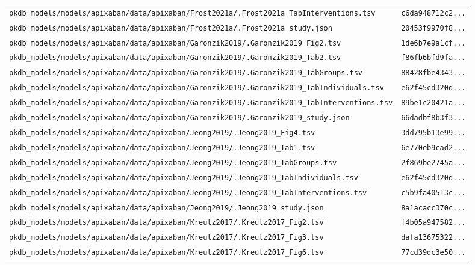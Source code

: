 \begin{longtable}{ll}
\texttt{pkdb\_models/models/apixaban/data/apixaban/Frost2021a/.Frost2021a\_TabInterventions.tsv} & \texttt{c6da948712c2...} \\
\texttt{pkdb\_models/models/apixaban/data/apixaban/Frost2021a/.Frost2021a\_study.json} & \texttt{20453f9970f8...} \\
\texttt{pkdb\_models/models/apixaban/data/apixaban/Garonzik2019/.Garonzik2019\_Fig2.tsv} & \texttt{1de6b7e9a1cf...} \\
\texttt{pkdb\_models/models/apixaban/data/apixaban/Garonzik2019/.Garonzik2019\_Tab2.tsv} & \texttt{f86fb6bfd9fa...} \\
\texttt{pkdb\_models/models/apixaban/data/apixaban/Garonzik2019/.Garonzik2019\_TabGroups.tsv} & \texttt{88428fbe4343...} \\
\texttt{pkdb\_models/models/apixaban/data/apixaban/Garonzik2019/.Garonzik2019\_TabIndividuals.tsv} & \texttt{e62f45cd320d...} \\
\texttt{pkdb\_models/models/apixaban/data/apixaban/Garonzik2019/.Garonzik2019\_TabInterventions.tsv} & \texttt{89be1c20421a...} \\
\texttt{pkdb\_models/models/apixaban/data/apixaban/Garonzik2019/.Garonzik2019\_study.json} & \texttt{66dadbf8b3f3...} \\
\texttt{pkdb\_models/models/apixaban/data/apixaban/Jeong2019/.Jeong2019\_Fig4.tsv} & \texttt{3dd795b13e99...} \\
\texttt{pkdb\_models/models/apixaban/data/apixaban/Jeong2019/.Jeong2019\_Tab1.tsv} & \texttt{6e770eb9cad2...} \\
\texttt{pkdb\_models/models/apixaban/data/apixaban/Jeong2019/.Jeong2019\_TabGroups.tsv} & \texttt{2f869be2745a...} \\
\texttt{pkdb\_models/models/apixaban/data/apixaban/Jeong2019/.Jeong2019\_TabIndividuals.tsv} & \texttt{e62f45cd320d...} \\
\texttt{pkdb\_models/models/apixaban/data/apixaban/Jeong2019/.Jeong2019\_TabInterventions.tsv} & \texttt{c5b9fa40513c...} \\
\texttt{pkdb\_models/models/apixaban/data/apixaban/Jeong2019/.Jeong2019\_study.json} & \texttt{8a1acacc370c...} \\
\texttt{pkdb\_models/models/apixaban/data/apixaban/Kreutz2017/.Kreutz2017\_Fig2.tsv} & \texttt{f4b05a947582...} \\
\texttt{pkdb\_models/models/apixaban/data/apixaban/Kreutz2017/.Kreutz2017\_Fig3.tsv} & \texttt{dafa13675322...} \\
\texttt{pkdb\_models/models/apixaban/data/apixaban/Kreutz2017/.Kreutz2017\_Fig6.tsv} & \texttt{77cd39dc3e50...} \\

\end{longtable}
